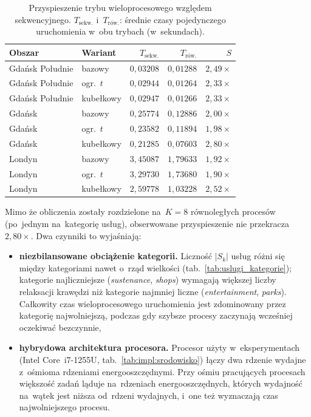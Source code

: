 \begin{table}[H]
\centering
\caption{Przyspieszenie trybu wieloprocesowego względem sekwencyjnego.
$T_{\text{sekw.}}$ i~$T_{\text{rów.}}$: średnie czasy pojedynczego
uruchomienia w~obu trybach (w~sekundach).}
\label{tab:wyniki:p3}
\begin{tabular}{l l r r r}
\hline
\textbf{Obszar} & \textbf{Wariant}
& $T_{\text{sekw.}}$ & $T_{\text{rów.}}$ & $S$ \\
\hline
Gdańsk Południe & bazowy     & $0{,}03208$ & $0{,}01288$ & $2{,}49\times$ \\
Gdańsk Południe & ogr.\ $t$  & $0{,}02944$ & $0{,}01264$ & $2{,}33\times$ \\
Gdańsk Południe & kubełkowy  & $0{,}02947$ & $0{,}01266$ & $2{,}33\times$ \\
\hline
Gdańsk          & bazowy     & $0{,}25774$ & $0{,}12886$ & $2{,}00\times$ \\
Gdańsk          & ogr.\ $t$  & $0{,}23582$ & $0{,}11894$ & $1{,}98\times$ \\
Gdańsk          & kubełkowy  & $0{,}21285$ & $0{,}07603$ & $2{,}80\times$ \\
\hline
Londyn          & bazowy     & $3{,}45087$ & $1{,}79633$ & $1{,}92\times$ \\
Londyn          & ogr.\ $t$  & $3{,}29730$ & $1{,}73680$ & $1{,}90\times$ \\
Londyn          & kubełkowy  & $2{,}59778$ & $1{,}03228$ & $2{,}52\times$ \\
\hline
\end{tabular}
\end{table}

Mimo że obliczenia zostały rozdzielone na~$K=8$ równoległych procesów
(po~jednym na~kategorię usług), obserwowane przyspieszenie nie przekracza
$2{,}80\times$. Dwa czynniki to wyjaśniają:

\begin{itemize}
  \item \textbf{niezbilansowane obciążenie kategorii.}
        Liczność $|S_k|$ usług różni się między kategoriami nawet o~rząd
        wielkości (tab.~\ref{tab:uslugi_kategorie}); kategorie najliczniejsze
        (\emph{sustenance}, \emph{shops}) wymagają większej liczby relaksacji
        krawędzi niż kategorie najmniej liczne (\emph{entertainment}, \emph{parks}).
        Całkowity czas wieloprocesowego uruchomienia jest zdominowany przez
        kategorię najwolniejszą, podczas gdy szybsze procesy zaczynają
        wcześniej oczekiwać bezczynnie,

  \item \textbf{hybrydowa architektura procesora.}
        Procesor użyty w~eksperymentach (Intel Core~i7-1255U,
        tab.~\ref{tab:impl:srodowisko}) łączy dwa rdzenie wydajne
        z~ośmioma rdzeniami energooszczędnymi. Przy ośmiu pracujących
        procesach większość zadań ląduje na~rdzeniach energooszczędnych,
        których wydajność na~wątek jest niższa od~rdzeni wydajnych,
        i~one też wyznaczają czas najwolniejszego procesu.
\end{itemize}

